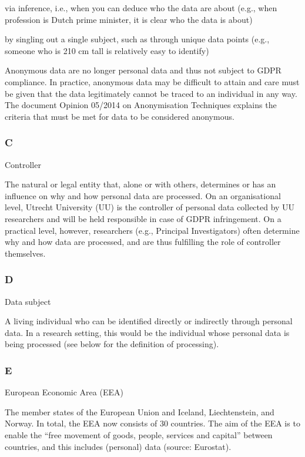 \documentclass[
]{book}
\begin{document}
via inference, i.e., when you can deduce who the data are about (e.g., when profession is Dutch prime minister, it is clear who the data is about)

by singling out a single subject, such as through unique data points (e.g., someone who is 210 cm tall is relatively easy to identify)

Anonymous data are no longer personal data and thus not subject to GDPR compliance. In practice, anonymous data may be difficult
to attain and care must be given that the data legitimately cannot be traced to an individual in any way. The document
Opinion 05/2014 on Anonymisation Techniques
explains the criteria that must be met for data to be considered anonymous.

\hypertarget{c}{%
\subsubsection{C}\label{c}}

Controller

The natural or legal entity that, alone or with others, determines or has an influence on why and how
personal data are processed. On an organisational level, Utrecht University (UU) is the controller of personal data
collected by UU researchers and will be held responsible in case of GDPR infringement. On a practical level, however,
researchers (e.g., Principal Investigators) often determine why and how data are processed, and are thus fulfilling the
role of controller themselves.

\hypertarget{d}{%
\subsubsection{D}\label{d}}

Data subject

A living individual who can be identified directly or indirectly through personal data. In a research setting,
this would be the individual whose personal data is being processed (see below for the definition of processing).

\hypertarget{e}{%
\subsubsection{E}\label{e}}

European Economic Area (EEA)

The member states of the European Union and Iceland, Liechtenstein, and Norway. In total, the EEA now consists of
30 countries. The aim of the EEA is to enable the ``free movement of goods, people, services and capital'' between countries,
and this includes (personal) data (source:
Eurostat).
\end{document}
